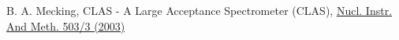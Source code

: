  B. A. Mecking, CLAS - A Large Acceptance Spectrometer (CLAS),                 \href{http://www.sciencedirect.com/science/article/pii/S0168900203010015}{Nucl. Instr. And Meth. 503/3 (2003)}

